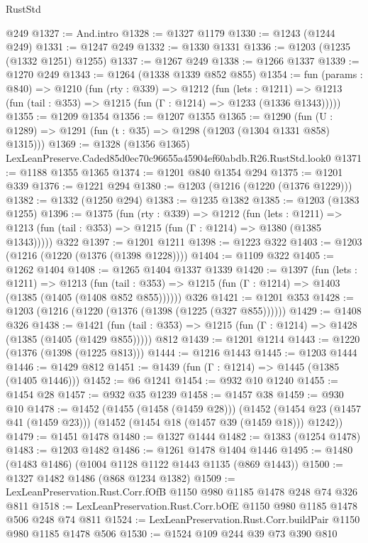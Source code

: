 \begin{lexlean}{RustStd}
\begin{coremodule}
    @249
@1327 := And.intro
@1328 := @1327 @1179
@1330 := @1243 (@1244 @249)
@1331 := @1247 @249
@1332 := @1330 @1331
@1336 := @1203 (@1235 (@1332 @1251) @1255)
@1337 := @1267 @249
@1338 := @1266 @1337
@1339 := @1270 @249
@1343 := @1264 (@1338 @1339 @852 @855)
@1354 := fun (params : @840) =>
  @1210
    (fun (rty : @339) =>
    @1212
      (fun (lets : @1211) =>
      @1213 (fun (tail : @353) => @1215 (fun (Γ : @1214) => @1233 (@1336 @1343)))))
@1355 := @1209 @1354
@1356 := @1207 @1355
@1365 := @1290 (fun (U : @1289) => @1291 (fun (t : @35) => @1298 (@1203 (@1304 @1331 @858) @1315)))
@1369 := @1328 (@1356 @1365) LexLeanPreserve.Caded85d0ec70c96655a45904ef60abdb.R26.RustStd.look0
@1371 := @1188 @1355 @1365
@1374 := @1201 @840 @1354 @294
@1375 := @1201 @339
@1376 := @1221 @294
@1380 := @1203 (@1216 (@1220 (@1376 @1229)))
@1382 := @1332 (@1250 @294)
@1383 := @1235 @1382
@1385 := @1203 (@1383 @1255)
@1396 := @1375
    (fun (rty : @339) =>
    @1212
      (fun (lets : @1211) =>
      @1213 (fun (tail : @353) => @1215 (fun (Γ : @1214) => @1380 (@1385 @1343)))))
    @322
@1397 := @1201 @1211
@1398 := @1223 @322
@1403 := @1203 (@1216 (@1220 (@1376 (@1398 @1228))))
@1404 := @1109 @322
@1405 := @1262 @1404
@1408 := @1265 @1404 @1337 @1339
@1420 := @1397
    (fun (lets : @1211) =>
    @1213 (fun (tail : @353) => @1215 (fun (Γ : @1214) => @1403 (@1385 (@1405 (@1408 @852 @855))))))
    @326
@1421 := @1201 @353
@1428 := @1203 (@1216 (@1220 (@1376 (@1398 (@1225 (@327 @855))))))
@1429 := @1408 @326
@1438 := @1421
    (fun (tail : @353) => @1215 (fun (Γ : @1214) => @1428 (@1385 (@1405 (@1429 @855)))))
    @812
@1439 := @1201 @1214
@1443 := @1220 (@1376 (@1398 (@1225 @813)))
@1444 := @1216 @1443
@1445 := @1203 @1444
@1446 := @1429 @812
@1451 := @1439 (fun (Γ : @1214) => @1445 (@1385 (@1405 @1446)))
@1452 := @6 @1241
@1454 := @932 @10 @1240
@1455 := @1454 @28
@1457 := @932 @35 @1239
@1458 := @1457 @38
@1459 := @930 @10
@1478 := @1452
    (@1455 (@1458 (@1459 @28)))
    (@1452 (@1454 @23 (@1457 @41 (@1459 @23))) (@1452 (@1454 @18 (@1457 @39 (@1459 @18))) @1242))
@1479 := @1451 @1478
@1480 := @1327 @1444
@1482 := @1383 (@1254 @1478)
@1483 := @1203 @1482
@1486 := @1261 @1478 @1404 @1446
@1495 := @1480 (@1483 @1486) (@1004 @1128 @1122 @1443 @1135 (@869 @1443))
@1500 := @1327 @1482 @1486 (@868 @1234 @1382)
@1509 := LexLeanPreservation.Rust.Corr.fOfB @1150 @980 @1185 @1478 @248 @74 @326 @811
@1518 := LexLeanPreservation.Rust.Corr.bOfE @1150 @980 @1185 @1478 @506 @248 @74 @811
@1524 := LexLeanPreservation.Rust.Corr.buildPair @1150 @980 @1185 @1478 @506
@1530 := @1524 @109 @244 @39 @73 @390 @810

\end{coremodule}
\end{lexlean}
